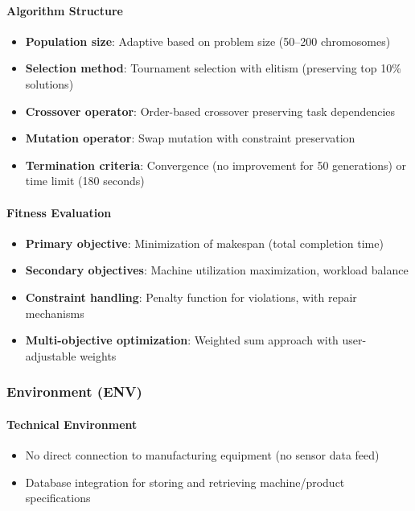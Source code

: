 \paragraph{Algorithm Structure}
\begin{itemize}
  \item \textbf{Population size}: Adaptive based on problem size (50--200 chromosomes)
  \item \textbf{Selection method}: Tournament selection with elitism (preserving top 10\% solutions)
  \item \textbf{Crossover operator}: Order-based crossover preserving task dependencies
  \item \textbf{Mutation operator}: Swap mutation with constraint preservation
  \item \textbf{Termination criteria}: Convergence (no improvement for 50 generations) or time limit (180 seconds)
\end{itemize}

\paragraph{Fitness Evaluation}
\begin{itemize}
  \item \textbf{Primary objective}: Minimization of makespan (total completion time)
  \item \textbf{Secondary objectives}: Machine utilization maximization, workload balance
  \item \textbf{Constraint handling}: Penalty function for violations, with repair mechanisms
  \item \textbf{Multi-objective optimization}: Weighted sum approach with user-adjustable weights
\end{itemize}

\subsubsection*{Environment (ENV)}

\paragraph{Technical Environment}
\begin{itemize}
  \item No direct connection to manufacturing equipment (no sensor data feed)
  \item Database integration for storing and retrieving machine/product specifications
\end{itemize}


